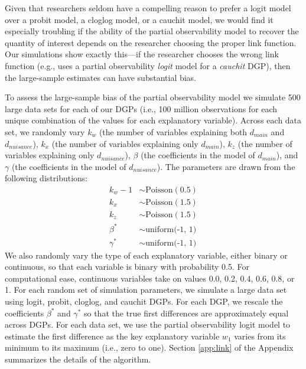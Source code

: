 \documentclass[10pt]{article}
\begin{document}
Given that researchers seldom have a compelling reason to prefer a logit model over a probit model, a cloglog model, or a cauchit model, we would find it especially troubling if the ability of the partial observability model to recover the quantity of interest depends on the researcher choosing the proper link function. 
Our simulations show exactly this---if the researcher chooses the wrong link function (e.g., uses a partial observability \textit{logit} model for a \textit{cauchit} DGP), then the large-sample estimates can have substantial bias.

To assess the large-sample bias of the partial observability model we simulate 500 large data sets for each of our DGPs (i.e., 100 million observations for each unique combination of the values for each explanatory variable). 
Across each data set, we randomly vary $k_w$ (the number of variables explaining both $d_{main}$ and $d_{nuisance}$), $k_x$ (the number of variables explaining only $d_{main}$), $k_z$ (the number of variables explaining only $d_{nuisance}$), $\beta$ (the coefficients in the model of $d_{main}$), and $\gamma$ (the coefficients in the model of $d_{nuisance}$). 
The parameters are drawn from the following distributions:
\begin{align*}
k_w - 1 &\sim \text{Poisson}(0.5)\\
k_x &\sim \text{Poisson}(1.5)\\
k_z &\sim \text{Poisson}(1.5)\\
\beta^* &\sim \text{uniform(-1, 1)}\\
\gamma^* &\sim \text{uniform(-1, 1)}
\end{align*}
We also randomly vary the type of each explanatory variable, either binary or continuous, so that each variable is binary with probability 0.5. For computational ease, continuous variables take on values 0.0, 0.2, 0.4, 0.6, 0.8, or 1.
For each random set of simulation parameters, we simulate a large data set using logit, probit, cloglog, and cauchit DGPs.  
For each DGP, we rescale the coefficients $\beta^*$ and $\gamma^*$ so that the true first differences are approximately equal across DGPs.
For each data set, we use the partial observability logit model to estimate the first difference as the key explanatory variable $w_1$ varies from its minimum to its maximum (i.e., zero to one). 
Section \ref{app:link} of the Appendix summarizes the details of the algorithm.
\end{document}
